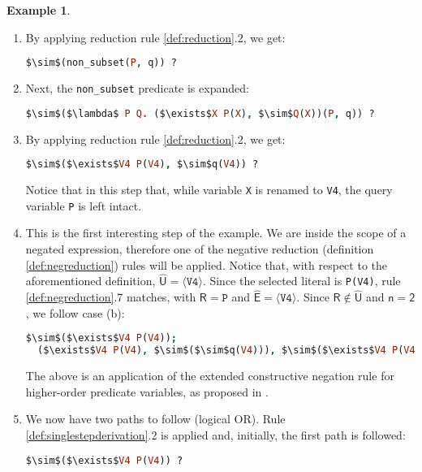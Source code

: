 \documentclass[inscr,ack,preface]{dithesis}
\theoremstyle{definition}
\newtheorem{example}{Example}[chapter]
\newcommand{\msf}[1]{$\mathsf{#1}$}
\begin{document}
\begin{example}
\begin{enumerate}
\item By applying reduction rule \ref{def:reduction}.2, we get:
\begin{lstlisting}[language=Prolog,%
  frame=single,breaklines=false,mathescape=true]
  $\sim$(non_subset(P, q)) ?
\end{lstlisting}

\item Next, the \texttt{non\_subset} predicate is expanded:
\begin{lstlisting}[language=Prolog,%
  frame=single,breaklines=false,mathescape=true]
  $\sim$($\lambda$ P Q. ($\exists$X P(X), $\sim$Q(X))(P, q)) ?
\end{lstlisting}

\item By applying reduction rule \ref{def:reduction}.2, we get:
\begin{lstlisting}[language=Prolog,%
  frame=single,breaklines=false,mathescape=true]
  $\sim$($\exists$V4 P(V4), $\sim$q(V4)) ?
\end{lstlisting}
Notice that in this step that, while variable \texttt{X} is renamed to \texttt{V4}, the query variable \texttt{P} is left intact.

\item This is the first interesting step of the example. We are inside the scope of a negated expression, therefore one of the negative reduction (definition \ref{def:negreduction}) rules will be applied. Notice that, with respect to the aforementioned definition, \msf{\widehat{U} = \langle \texttt{V4} \rangle}. Since the selected literal is \texttt{P(V4)}, rule \ref{def:negreduction}.7 matches, with \msf{R = \texttt{P}} and \msf{\widehat{E} = \langle \texttt{V4} \rangle}. Since \msf{R \not\in \widehat{U}} and \msf{n=2}, we follow case (b):
\begin{lstlisting}[language=Prolog,%
  frame=single,breaklines=false,mathescape=true]
  $\sim$($\exists$V4 P(V4));
  ($\exists$V4 P(V4), $\sim$($\sim$q(V4))), $\sim$($\exists$V4 P(V4), $\sim$q(V4)) ?
\end{lstlisting}
The above is an application of the extended constructive negation rule for higher-order predicate variables, as proposed in \cite{DBLP:conf/kr/CharalambidisR14}.

\item We now have two paths to follow (logical OR). Rule \ref{def:singlestepderivation}.2 is applied and, initially, the first path is followed:
\begin{lstlisting}[language=Prolog,%
  frame=single,breaklines=false,mathescape=true]
  $\sim$($\exists$V4 P(V4)) ?
\end{lstlisting}


\end{enumerate}
\end{example}
\end{document}
